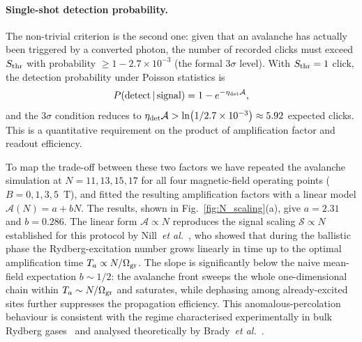 \paragraph{Single-shot detection probability.}
The non-trivial criterion is the second one: given that an avalanche has actually been triggered by a converted photon, the number of recorded clicks must exceed $S_{\rm thr}$ with probability $\geq 1 - 2.7 \times 10^{-3}$ (the formal $3\sigma$ level). With $S_{\rm thr} = 1$ click, the detection probability under Poisson statistics is
\begin{equation}
    P(\text{detect}\,|\,\text{signal}) = 1 - e^{-\eta_{\rm det} \mathcal{A}},
    \label{eq:detection_probability}
\end{equation}
and the $3\sigma$ condition reduces to $\eta_{\rm det}\mathcal{A} > \ln(1/2.7\times 10^{-3}) \approx 5.92$ expected clicks. This is a quantitative requirement on the product of amplification factor and readout efficiency.

To map the trade-off between these two factors we have repeated the avalanche simulation at $N = 11, 13, 15, 17$ for all four magnetic-field operating points ($B = 0, 1, 3, 5$~T), and fitted the resulting amplification factors with a linear model $\mathcal{A}(N) = a + bN$. The results, shown in Fig.~\ref{fig:N_scaling}(a), give $a = 2.31$ and $b = 0.286$. The linear form $\mathcal{A} \propto N$ reproduces the signal scaling $\mathcal{S} \propto N$ established for this protocol by Nill~\emph{et al.}~\cite{Nill2024}, who showed that during the ballistic phase the Rydberg-excitation number grows linearly in time up to the optimal amplification time $T_a \propto N/\Omega_{\rm gr}$. The slope is significantly below the naive mean-field expectation $b \sim 1/2$: the avalanche front sweeps the whole one-dimensional chain within $T_a \sim N/\Omega_{\rm gr}$ and saturates, while dephasing among already-excited sites further suppresses the propagation efficiency. This anomalous-percolation behaviour is consistent with the regime characterised experimentally in bulk Rydberg gases~\cite{Helmrich2020, Wintermantel2021} and analysed theoretically by Brady~\emph{et al.}~\cite{Brady2024}.

